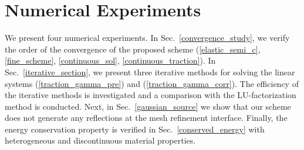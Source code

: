 \section{Numerical Experiments}
We present four numerical experiments. 
 In Sec.~\ref{convergence_study}, we verify the order of the convergence of the proposed scheme (\ref{elastic_semi_c}, \ref{fine_scheme}, \ref{continuous_sol}, \ref{continuous_traction}).  In  Sec.~\ref{iterative_section}, we present three iterative methods for solving the linear systems (\ref{traction_gamma_pre}) and (\ref{traction_gamma_corr}). The efficiency of the iterative methods is investigated and a comparison with the LU-factorization method is conducted. Next, in Sec.~\ref{gaussian_source} we show that our scheme does not generate any reflections at the mesh refinement interface. Finally, the energy conservation property is verified in Sec.~\ref{conserved_energy} with heterogeneous and discontinuous material properties.